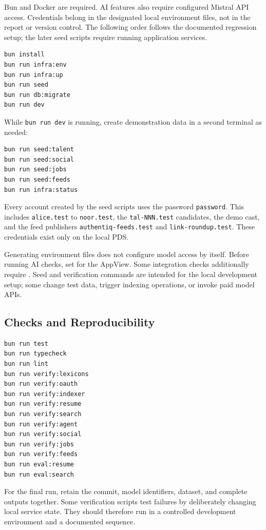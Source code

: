 \documentclass[11pt,a4paper]{article}
\newcommand{\code}[1]{\texttt{#1}}
\begin{document}
Bun and Docker are required. AI features also require configured Mistral API access. Credentials belong in the designated local environment files, not in the report or version control. The following order follows the documented regression setup; the later seed scripts require running application services.

\begin{lstlisting}
bun install
bun run infra:env
bun run infra:up
bun run seed
bun run db:migrate
bun run dev
\end{lstlisting}

While \code{bun run dev} is running, create demonstration data in a second terminal as needed:

\begin{lstlisting}
bun run seed:talent
bun run seed:social
bun run seed:jobs
bun run seed:feeds
bun run infra:status
\end{lstlisting}

Every account created by the seed scripts uses the password \code{password}. This includes \code{alice.test} to \code{noor.test}, the \code{tal-NNN.test} candidates, the demo cast, and the feed publishers \code{authentiq-feeds.test} and \code{link-roundup.test}. These credentials exist only on the local PDS.

Generating environment files does not configure model access by itself. Before running AI checks, set  for the AppView. Some integration checks additionally require . Seed and verification commands are intended for the local development setup; some change test data, trigger indexing operations, or invoke paid model APIs.

\subsection{Checks and Reproducibility}

\begin{lstlisting}
bun run test
bun run typecheck
bun run lint
bun run verify:lexicons
bun run verify:oauth
bun run verify:indexer
bun run verify:resume
bun run verify:search
bun run verify:agent
bun run verify:social
bun run verify:jobs
bun run verify:feeds
bun run eval:resume
bun run eval:search
\end{lstlisting}

For the final run, retain the commit, model identifiers, dataset, and complete outputs together. Some verification scripts test failures by deliberately changing local service state. They should therefore run in a controlled development environment and a documented sequence.
\end{document}
